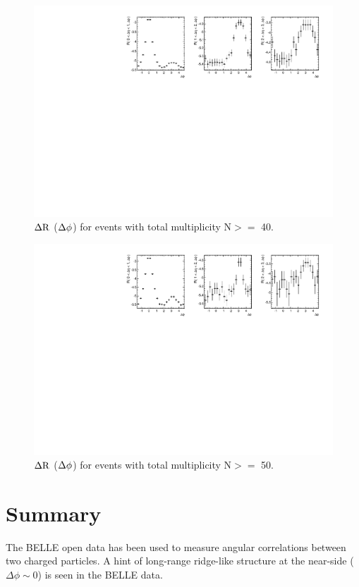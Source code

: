 \documentclass[%
preprint,
 amsmath,amssymb,
 aps,
]{revtex4-1}
\begin{document}
\begin{figure}[!htb]
\begin{center}
\includegraphics[width=.95\textwidth]{figures/canvasProjection_isBelle1_mult40.pdf}
\caption{$\rm \Delta R$ ($\rm \Delta\phi$) for events with total multiplicity N$>=$ 40. }
\label{fig:ProjectionMult40} 
\end{center}
\end{figure}

\begin{figure}[!htb]
\begin{center}
\includegraphics[width=.95\textwidth]{figures/canvasProjection_isBelle1_mult50.pdf}
\caption{$\rm \Delta R$ ($\rm \Delta\phi$) for events with total multiplicity N$>=$ 50. }
\label{fig:ProjectionMult50} 
\end{center}
\end{figure}


\section{Summary}

The BELLE open data has been used to measure angular correlations between two charged particles. A hint of long-range ridge-like structure at the near-side ($\Delta\phi\sim 0$) is seen in the BELLE data. 
\end{document}
